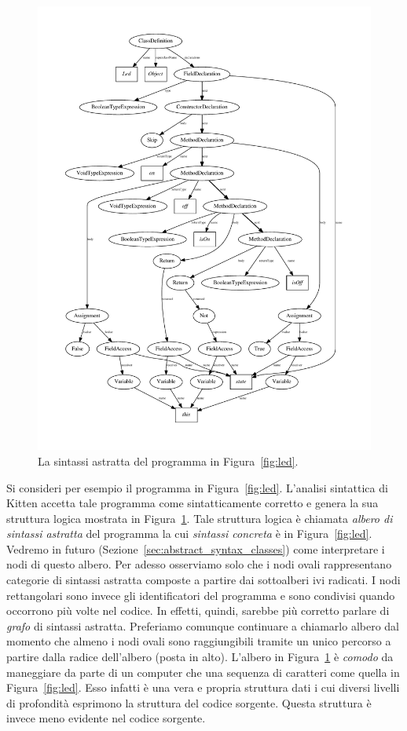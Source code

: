 \begin{figure}
\begin{center}
\includegraphics[width=16cm]{led_logica.pdf}
\end{center}
\caption{La sintassi astratta del programma in Figura~\ref{fig:led}.}
  \label{fig:led_albero}
\end{figure}
%
Si consideri per esempio il programma in Figura~\ref{fig:led}. L'analisi
sintattica di Kitten accetta tale programma come sintatticamente corretto
e genera la sua struttura logica mostrata in Figura~\ref{fig:led_albero}.
Tale struttura logica \`e chiamata \emph{albero di sintassi astratta}
del programma la cui \emph{sintassi concreta} \`e in Figura~\ref{fig:led}.
Vedremo in futuro (Sezione~\ref{sec:abstract_syntax_classes})
come interpretare i nodi di questo albero. Per adesso
osserviamo solo che i nodi ovali rappresentano categorie di sintassi
astratta composte a partire dai sottoalberi ivi radicati. I nodi rettangolari
sono invece gli identificatori del programma e sono condivisi quando
occorrono pi\`u volte nel codice. In effetti, quindi, sarebbe pi\`u
corretto parlare di \emph{grafo} di sintassi astratta. Preferiamo comunque
continuare a chiamarlo albero dal momento che almeno
i nodi ovali sono raggiungibili tramite
un unico percorso a partire dalla radice dell'albero (posta in alto).
L'albero in Figura~\ref{fig:led_albero} \`e \piu \emph{comodo} da
maneggiare da parte di un computer che una sequenza di caratteri come
quella in Figura~\ref{fig:led}. Esso infatti \`e una vera e propria
struttura dati i cui diversi livelli di profondit\`a esprimono
la struttura del codice sorgente. Questa struttura \`e invece
meno evidente nel codice sorgente.

